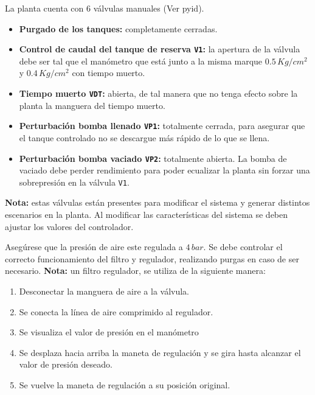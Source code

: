 \begin{tcolorbox}[title=Válvulas manuales, breakable]

La planta cuenta con 6 válvulas manuales (Ver \gls{pyid}).

 \begin{itemize}
  \item \textbf{Purgado de los tanques:} completamente cerradas.
  \item \textbf{Control de caudal del tanque de reserva \texttt{V1}:}
  la apertura de la válvula debe ser tal que el manómetro que está junto
  a la misma marque $0.5\,{Kg}/{cm^2}$ y $0.4\,{Kg}/{cm^2}$ con tiempo muerto. 
  \item \textbf{Tiempo muerto \texttt{VDT}:} abierta, de tal manera que no
tenga efecto sobre la  planta la manguera del tiempo muerto.
  \item \textbf{Perturbación bomba llenado \texttt{VP1}:} totalmente cerrada,
para asegurar que el tanque controlado no se descargue más rápido de lo que se
llena.
  \item \textbf{Perturbación bomba vaciado \texttt{VP2}:} totalmente abierta.
  La bomba de vaciado debe perder rendimiento para poder ecualizar la planta
sin forzar una sobrepresión en la válvula \texttt{V1}.
 \end{itemize}
 \tcblower
 \textbf{Nota:} estas válvulas están presentes para modificar el sistema y
generar distintos
escenarios en la planta. Al modificar las características del sistema se deben
ajustar los valores del controlador.
\end {tcolorbox}

\begin{tcolorbox}[title=Presión de aire]
  Asegúrese que la presión de aire este regulada a $4\,bar$. Se debe controlar
  el correcto funcionamiento del filtro y regulador, realizando purgas en caso
de ser necesario.
 \tcblower
  \textbf{Nota:} un filtro regulador, se utiliza de la siguiente manera:
 \begin{enumerate}
    \item Desconectar la manguera de aire a la válvula.
    \item Se conecta la línea de aire comprimido al regulador.
    \item Se visualiza el valor de presión en el manómetro
    \item Se desplaza hacia arriba la maneta de regulación y se gira hasta
      alcanzar el valor de presión deseado.
    \item Se vuelve la maneta de regulación a su posición original.
 \end{enumerate}
\end {tcolorbox}


